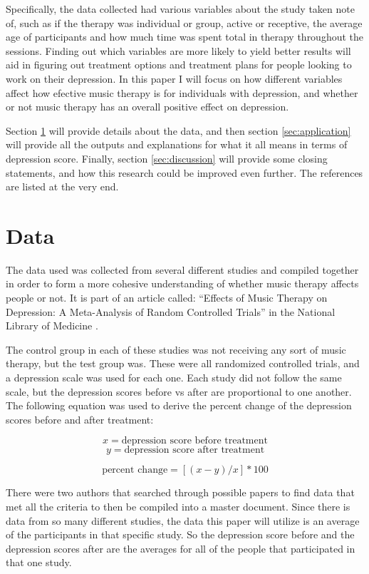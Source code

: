 \documentclass[12pt, titlepage]{article}
\begin{document}
 Specifically, the data collected had various variables about the study taken note of, such as if the therapy was individual or group, active or receptive, the average age of participants and how much time was spent total in therapy throughout the sessions. Finding out which variables are more likely to yield better results will aid in figuring out treatment options and treatment plans for people looking to work on their depression. In this paper I will focus on how different variables affect how efective music therapy is for individuals with depression, and whether or not music therapy has an overall positive effect on depression.

 Section \ref{sec:data} will provide details about the data, and then section \ref{sec:application} will provide all the outputs and explanations for what it all means in terms of depression score. Finally, section \ref{sec:discussion} will provide some closing statements, and how this research could be improved even further. The references are listed at the very end.

 \section{Data} 
 \label{sec:data}

 The data used was collected from several different studies and compiled together in order to form a more cohesive understanding of whether music therapy affects people or not. It is part of an article called: “Effects of Music Therapy on Depression: A Meta-Analysis of Random Controlled Trials” in the National Library of Medicine \citet{PLOS}. 

 The control group in each of these studies was not receiving any sort of music therapy, but the test group was. These were all randomized controlled trials, and a depression scale was used for each one. Each study did not follow the same scale, but the depression scores before vs after are proportional to one another. The following equation was used to derive the percent change of the depression scores before and after treatment:

 $$x = \text{depression score before treatment}$$
 $$y = \text{depression score after treatment}$$

 $$\text{percent change} = [(x-y)/x]*100$$ 
 
 There were two authors that searched through possible papers to find data that met all the criteria to then be compiled into a master document. Since there is data from so many different studies, the data this paper will utilize is an average of the participants in that specific study. So the depression score before and the depression scores after are the averages for all of the people that participated in that one study. 
 
\end{document}
